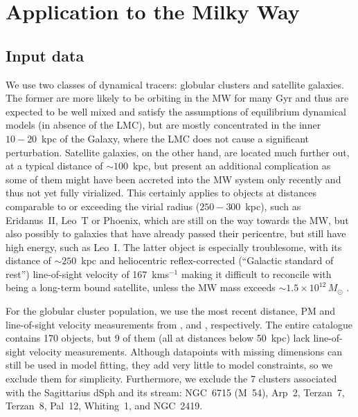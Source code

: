 \documentclass[usenatbib,fleqn]{mnras}
\newcommand{\kms}{km\:s$^{-1}$\xspace}
\begin{document}
\section{Application to the Milky Way}  \label{sec:MW}

\subsection{Input data}  \label{sec:input_catalogues}

We use two classes of dynamical tracers: globular clusters and satellite galaxies. The former are more likely to be orbiting in the MW for many Gyr and thus are expected to be well mixed and satisfy the assumptions of equilibrium dynamical models (in absence of the LMC), but are mostly concentrated in the inner $10-20$~kpc of the Galaxy, where the LMC does not cause a significant perturbation. Satellite galaxies, on the other hand, are located much further out, at a typical distance of $\sim100$~kpc, but present an additional complication as some of them might have been accreted into the MW system only recently and thus not yet fully virialized. This certainly applies to objects at distances comparable to or exceeding the virial radius ($250-300$~kpc), such as Eridanus~II, Leo~T or Phoenix, which are still on the way towards the MW, but also possibly to galaxies that have already passed their pericentre, but still have high energy, such as Leo~I. The latter object is especially troublesome, with its distance of $\sim250$~kpc and heliocentric reflex-corrected (``Galactic standard of rest'') line-of-sight velocity of 167~\kms making it difficult to reconcile with being a long-term bound satellite, unless the MW mass exceeds $\sim1.5\times10^{12}\,M_\odot$ \citep[e.g.,][]{Kulessa1992, BoylanKolchin2013}.

For the globular cluster population, we use the most recent distance, PM and line-of-sight velocity measurements from \citet{Baumgardt2021}, \citet{Vasiliev2021a} and \citet{Baumgardt2019}, respectively. The entire catalogue contains 170 objects, but 9 of them (all at distances below 50~kpc) lack line-of-sight velocity measurements. Although datapoints with missing dimensions can still be used in model fitting, they add very little to model constraints, so we exclude them for simplicity. Furthermore, we exclude the 7 clusters associated with the Sagittarius dSph and its stream: NGC~6715 (M~54), Arp~2, Terzan~7, Terzan~8, Pal~12, Whiting~1, and NGC~2419. 
\end{document}
